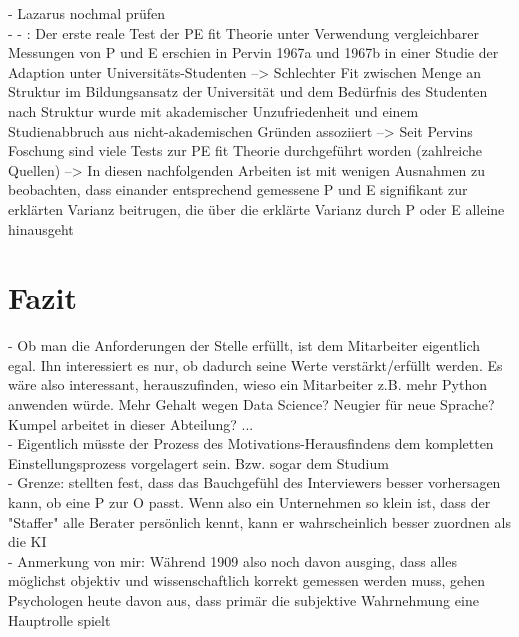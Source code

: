 - Lazarus nochmal prüfen \\
- - \cite[S. 8]{caplan:1987}: Der erste reale Test der PE fit Theorie unter Verwendung vergleichbarer Messungen von P und E erschien in Pervin 1967a und 1967b in einer Studie der Adaption unter Universitäts-Studenten --> Schlechter Fit zwischen Menge an Struktur im Bildungsansatz der Universität und dem Bedürfnis des Studenten nach Struktur wurde mit akademischer Unzufriedenheit und einem Studienabbruch aus nicht-akademischen Gründen assoziiert --> Seit Pervins Foschung sind viele Tests zur PE fit Theorie durchgeführt worden (zahlreiche Quellen) --> In diesen nachfolgenden Arbeiten ist mit wenigen Ausnahmen zu beobachten, dass einander entsprechend gemessene P und E signifikant zur erklärten Varianz beitrugen, die über die erklärte Varianz durch P oder E alleine hinausgeht\\

\section{Fazit}
\label{ch:fazit}
- Ob man die Anforderungen der Stelle erfüllt, ist dem Mitarbeiter eigentlich egal. Ihn interessiert es nur, ob dadurch seine Werte verstärkt/erfüllt werden. Es wäre also interessant, herauszufinden, wieso ein Mitarbeiter z.B. mehr Python anwenden würde. Mehr Gehalt wegen Data Science? Neugier für neue Sprache? Kumpel arbeitet in dieser Abteilung? ... \\
- Eigentlich müsste der Prozess des Motivations-Herausfindens dem kompletten Einstellungsprozess vorgelagert sein. Bzw. sogar dem Studium \\
- Grenze: \textcite{cable:1997} stellten fest, dass das Bauchgefühl des Interviewers besser vorhersagen kann, ob eine P zur O passt. Wenn also ein Unternehmen so klein ist, dass der "Staffer" alle Berater persönlich kennt, kann er wahrscheinlich besser zuordnen als die KI \\
- Anmerkung von mir: Während \textcite{parsons:1909} 1909 also noch davon ausging, dass alles möglichst objektiv und wissenschaftlich korrekt gemessen werden muss, gehen Psychologen heute davon aus, dass primär die subjektive Wahrnehmung eine Hauptrolle spielt \\

